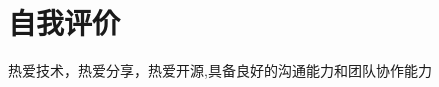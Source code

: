 \documentclass[]{deedy-resume-openfont}
\begin{document}
\begin{minipage}[t]{0.73\textwidth}

\section{自我评价}
\sectionsep
\begin{tightemize}
    \item 热爱技术，热爱分享，热爱开源,具备良好的沟通能力和团队协作能力
\end{tightemize}


% 
% 

\end{minipage} 
\end{document}

